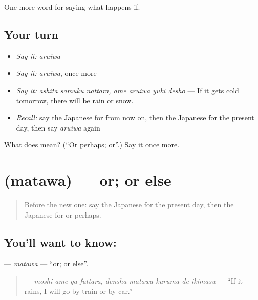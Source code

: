\begin{grammarlens}[title={What you've built}]
One more word for saying what happens if.
\end{grammarlens}

\subsection*{Your turn}
\begin{itemize}
\raggedright
  \item \emph{Say it:} \emph{aruiwa}
  \item \emph{Say it:} \emph{aruiwa}, once more
  \item \emph{Say it:} \emph{ashita samuku nattara, ame aruiwa yuki deshō} — If it gets cold tomorrow, there will be rain or snow.
  \item \emph{Recall:} say the Japanese for from now on, then the Japanese for the present day, then say \emph{aruiwa} again
\end{itemize}

\begin{tcolorbox}[breakable,colback=teal!4,colframe=teal!35!black,title={Before you move on}]
What does  mean? (\textquotedblleft{}Or perhaps; or\textquotedblright{}.) Say it once more.
\end{tcolorbox}
\section[\texorpdfstring{\ja{または} (matawa)}{または (matawa)}]{ (matawa) — or; or else}

\label{lesson:JA-C528-matawa}



\begin{quote}
Before the new one: say the Japanese for the present day, then the Japanese for or perhaps.
\end{quote}

\subsection*{You'll want to know: }
\textbf{} — \emph{matawa} — \textquotedblleft{}or; or else\textquotedblright{}.

\begin{quote}
\textbf{     } — \emph{moshi ame ga futtara, densha matawa kuruma de ikimasu} — \textquotedblleft{}If it rains, I will go by train or by car.\textquotedblright{}
\end{quote}

